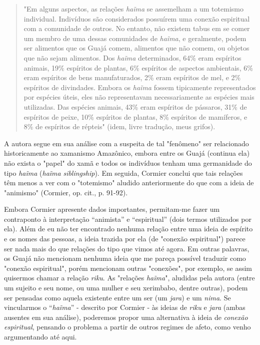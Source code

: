 \begin{quote}
"Em alguns aspectos, as relações \emph{haĩma} se assemelham a um
totemismo individual. Indivíduos são considerados possuírem uma conexão
espiritual com a comunidade de outros. No entanto, não existem tabus em
se comer um membro de uma dessas comunidades de \emph{haĩma}, e
geralmente, podem ser alimentos que os Guajá comem, alimentos que não
comem, ou objetos que não sejam alimentos. Dos \emph{haĩma}
determinados, 64\% eram espíritos animais, 19\% espíritos de plantas,
6\% espíritos de aspectos ambientais, 6\% eram espíritos de bens
manufaturados, 2\% eram espíritos de mel, e 2\% espíritos de divindades.
Embora os \emph{haĩma} fossem tipicamente representados por espécies
úteis, eles não representavam necessariamente as espécies mais
utilizadas. Das espécies animais, 43\% eram espíritos de pássaros, 31\%
de espíritos de peixe, 10\% espíritos de plantas, 8\% espíritos de
mamíferos, e 8\% de espíritos de répteis" (idem, livre tradução, meus
grifos).
\end{quote}

A autora segue em sua análise com a suspeita de tal "fenômeno" ser
relacionado historicamente ao xamanismo Amazônico, embora entre os Guajá
(continua ela) não exista o "papel" do xamã e todos os indivíduos tenham
uma germanidade do tipo \emph{haĩma} (\emph{haĩma} \emph{siblingship}).
Em seguida, Cormier conclui que tais relações têm menos a ver com o
"totemismo" aludido anteriormente do que com a ideia de "animismo"
(Cormier, op. cit., p. 91-92).

Embora Cormier apresente dados importantes, permitam-me fazer um
contraponto à interpretação ``animista'' e ``espiritual'' (dois termos
utilizados por ela). Além de eu não ter encontrado nenhuma relação entre
uma ideia de espírito e os nomes das pessoas, a ideia trazida por ela
(de "conexão espiritual") parece ser nada mais do que relações do tipo
que vimos até agora. Em outras palavras, os Guajá não mencionam nenhuma
ideia que me pareça possível traduzir como "conexão espiritual", porém
mencionam outras "conexões", por exemplo, se assim quisermos chamar a
relação \emph{riku}. As "relações \emph{haĩma}", aludidas pela autora
(entre um sujeito e seu nome, ou uma mulher e seu xerimbabo, dentre
outras), podem ser pensadas como aquela existente entre um ser (um
\emph{jara}) e um \emph{nima}. Se vincularmos o ``\emph{haĩma}'' -
descrito por Cormier - às ideias de \emph{riku} e \emph{jara} (ambas
ausentes em sua análise), poderemos propor uma alternativa à ideia de
\emph{conexão espiritual}, pensando o problema a partir de outros
regimes de afeto, como venho argumentando até aqui.

